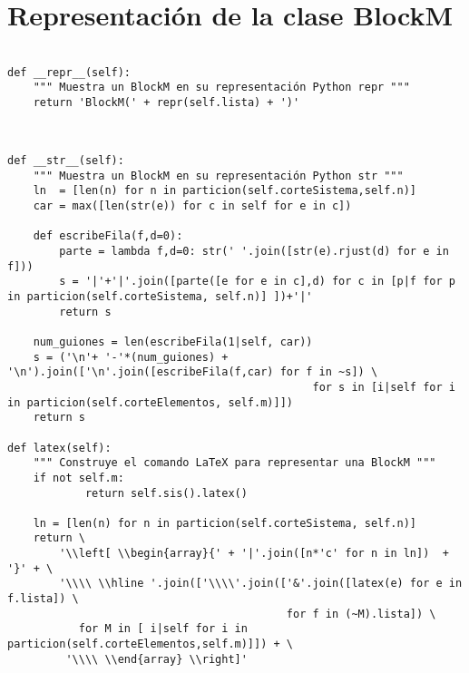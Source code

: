 \documentclass[11pt]{report}
\begin{document}
\section{Representación de la clase BlockM}
\label{sec:orgdf6709f}

\begin{verbatim}

def __repr__(self):
    """ Muestra un BlockM en su representación Python repr """
    return 'BlockM(' + repr(self.lista) + ')'
                           
\end{verbatim}


\begin{verbatim}

def __str__(self):
    """ Muestra un BlockM en su representación Python str """
    ln  = [len(n) for n in particion(self.corteSistema,self.n)]
    car = max([len(str(e)) for c in self for e in c])

    def escribeFila(f,d=0):
        parte = lambda f,d=0: str(' '.join([str(e).rjust(d) for e in f])) 
        s = '|'+'|'.join([parte([e for e in c],d) for c in [p|f for p in particion(self.corteSistema, self.n)] ])+'|'
        return s
    
    num_guiones = len(escribeFila(1|self, car))
    s = ('\n'+ '-'*(num_guiones) + '\n').join(['\n'.join([escribeFila(f,car) for f in ~s]) \
                                               for s in [i|self for i in particion(self.corteElementos, self.m)]])
    return s

def latex(self):
    """ Construye el comando LaTeX para representar una BlockM """
    if not self.m:
            return self.sis().latex()

    ln = [len(n) for n in particion(self.corteSistema, self.n)]                                                           
    return \
        '\\left[ \\begin{array}{' + '|'.join([n*'c' for n in ln])  + '}' + \
        '\\\\ \\hline '.join(['\\\\'.join(['&'.join([latex(e) for e in f.lista]) \
                                           for f in (~M).lista]) \
           for M in [ i|self for i in particion(self.corteElementos,self.m)]]) + \
         '\\\\ \\end{array} \\right]'
        
\end{verbatim}
\end{document}
